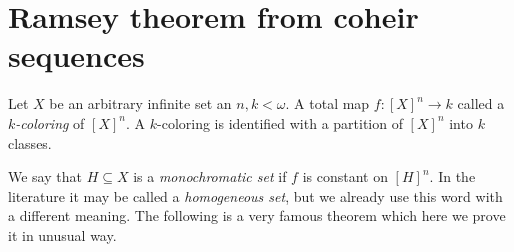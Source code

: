 \documentclass[creche.tex]{subfiles}
\begin{document}



% 



% 



\section{Ramsey theorem from coheir sequences}
\label{Ramsey}

\def\medrel#1{\parbox[t]{6ex}{$\displaystyle\hfil #1$}}
\def\ceq#1#2#3{\parbox[t]{9ex}{$\displaystyle #1$}\medrel{#2}{$\displaystyle #3$}}


Let $X$ be an arbitrary infinite set an $n,k<\omega$.
A total map $f:[X]^n\to k$ called a \emph{$k$-coloring\/} of $[X]^n$.
A $k$-coloring is identified with a partition of $[X]^n$ into $k$ classes.


We say that $H\subseteq X$ is a \emph{monochromatic set\/} if $f$ is constant on $[H]^n$.
In the literature it may be called a \emph{homogeneous set}, but we already use this word with a different meaning.
The following is a very famous theorem which here we prove it in unusual way.
\end{document}

